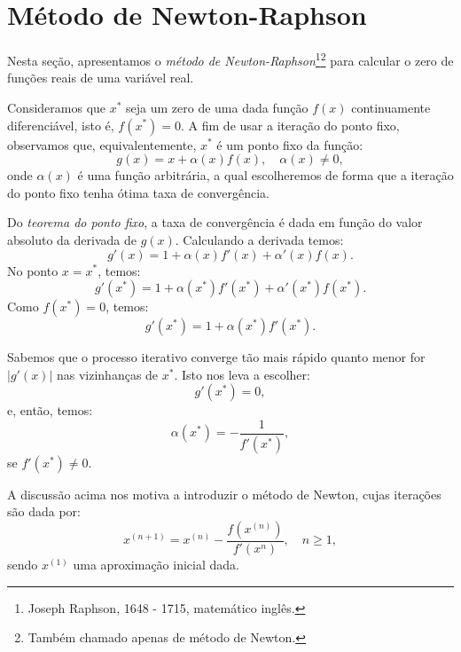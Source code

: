 \documentclass[
	12pt,				%
	oneside,			%
	a4paper,			%
	english,			%
	french,				%
	spanish,			%
	brazil				%
	]{abntex2}
\begin{document}
\section{Método de Newton-Raphson}\label{sec:metodo_Newton_1d}

Nesta seção, apresentamos o \emph{método de Newton-Raphson}\footnote{Joseph Raphson, 1648 - 1715, matemático inglês.}\footnote{Também chamado apenas de método de Newton.} para calcular o zero de funções reais de uma variável real. 

Consideramos que $x^*$ seja um zero de uma dada função $f(x)$ continuamente diferenciável, isto é, $f(x^*) = 0$. A fim de usar a iteração do ponto fixo, observamos que, equivalentemente, $x^*$ é um ponto fixo da função:
\begin{equation}
  g(x)= x + \alpha(x)f(x),\quad\alpha(x)\neq 0,
\end{equation}
onde $\alpha(x)$ é uma função arbitrária, a qual escolheremos de forma que a iteração do ponto fixo tenha ótima taxa de convergência. 

Do \emph{teorema do ponto fixo}, a taxa de convergência é dada em função do valor absoluto da derivada de $g(x)$. Calculando a derivada temos:
\begin{equation}
  g'(x)=1+\alpha(x)f'(x)+\alpha'(x)f(x).
\end{equation}
No ponto $x = x^*$, temos:
\begin{equation}
  g'(x^*) = 1 + \alpha(x^*)f'(x^*) + \alpha'(x^*)f(x^*).
\end{equation}
Como $f(x^*)=0$, temos:
\begin{equation}
  g'(x^*) = 1 + \alpha(x^*)f'(x^*).
\end{equation}

Sabemos que o processo iterativo converge tão mais rápido quanto menor for $|g'(x)|$ nas vizinhanças de $x^*$. Isto nos leva a escolher:
\begin{equation}
  g'(x^*) = 0,
\end{equation}
e, então, temos:
\begin{equation}
  \alpha(x^*) = -\dfrac{1}{f'(x^*)},
\end{equation}
se $f'(x^*)\neq 0$.

A discussão acima nos motiva a introduzir o método de Newton, cujas iterações são dada por:
\begin{equation}
  x^{(n+1)} = x^{(n)} - \dfrac{f\left(x^{(n)}\right)}{f'\left(x^{n}\right)}, \quad n\geq 1,
\end{equation}
sendo $x^{(1)}$ uma aproximação inicial dada.
\end{document}
